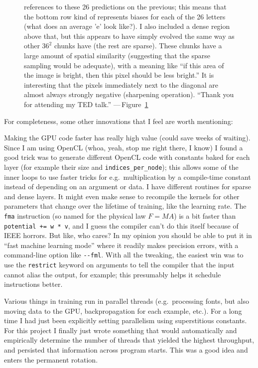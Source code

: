 \documentclass[twocolumn]{article} %
\begin{document}
\begin{figure}[ht]
{    references to these 26 predictions on the previous; this means
    that the bottom row kind of represents biases for each of the 26
    letters (what does an average 'e' look like?). I also included a
    dense region above that, but this appears to have simply evolved
    the same way as other $36^2$ chunks have (the rest are sparse).
    These chunks have a large amount of spatial similarity (suggesting
    that the sparse sampling would be adequate), with a meaning like
    ``if this area of the image is bright, then this pixel should
    be less bright.'' It is interesting that the pixels immediately
    next to the diagonal are almost always strongly negative
    (sharpening operation). ``Thank you for attending my TED talk.''
    ---\,Figure~\ref{fig:lastlayer}}
  \label{fig:lastlayer}
\end{figure}

For completeness, some other innovations that I feel are worth
mentioning:

Making the GPU code faster has really high value (could save weeks of
waiting). Since I am using OpenCL (whoa, yeah, stop me right there, I
know) I found a good trick was to generate different OpenCL code with
constants baked for each layer (for example their size and
\verb+indices_per_node+); this allows some of the inner loops to use
faster tricks for e.g.~multiplication by a compile-time constant
instead of depending on an argument or data. I have different routines
for sparse and dense layers. It might even make sense to recompile the
kernels for other parameters that change over the lifetime of
training, like the learning rate. The {\tt fma} instruction (so named
for the physical law $F=MA$) is a bit faster than
\verb|potential += w * v|, and I guess the compiler can't do this
itself because of IEEE horrors. But like, who cares? In my opinion you
should be able to put it in ``fast machine learning mode'' where it
readily makes precision errors, with a command-line option like
\verb+--fml+. With all the tweaking, the easiest win was to use the
{\tt restrict} keyword on arguments to tell the compiler that the
input cannot alias the output, for example; this presumably helps
it schedule instructions better.

Various things in training run in parallel threads (e.g.~processing
fonts, but also moving data to the GPU, backpropagation for each
example, etc.). For a long time I had just been explicitly setting
parallelism using superstitious constants. For this project I finally
just wrote something that would automatically and empirically
determine the number of threads that yielded the highest throughput,
and persisted that information across program starts. This was a
good idea and enters the permanent rotation.
\end{document}
